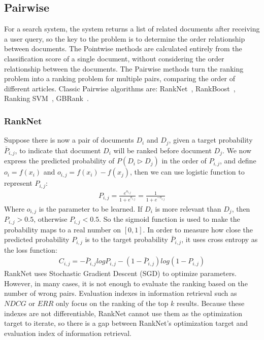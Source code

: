 \subsection{Pairwise}
For a search system, the system returns a list of related documents after receiving a user query, so the key to the problem is to determine the order relationship between documents. The Pointwise methods are calculated entirely from the classification score of a single document, without considering the order relationship between the documents. The Pairwise methods turn the ranking problem into a ranking problem for multiple pairs, comparing the order of different articles.
Classic Pairwise algorithms are: RankNet~\cite{Burges:2005:LRU:1102351.1102363}, RankBoost~\cite{freund2003efficient}, Ranking SVM~\cite{joachims2002optimizing}, GBRank~\cite{zheng2007regression}.
 \subsubsection{RankNet}
Suppose there is now a pair of documents $ D_i $ and $ D_j $, given a target probability $\bar{P}_{i,j}$, to indicate that document $ D_i $ will be ranked before document $ D_j $. We now express the predicted probability of $P(D_i \triangleright D_j)$ in the order of $P_{i,j}$, and define $o_i = f(x_i)$ and $o_{i,j}=f(x_i)-f(x_j)$, then we can use logistic function to represent $ P_ {i, j} $:
\begin{equation}
\begin{aligned}
P_{i,j} = \frac{e^{o_{i,j}}}{1+e^{o_{i,j}}} = \frac{1}{1+e^{-o_{i,j}}}
\end{aligned}
\label{eqn:eq6}
\end{equation}
Where $ o_{i,j} $ is the parameter to be learned. If $ D_i $  is more relevant than $ D_j $, then $P_{i,j}>0.5$, otherwise $P_{i,j}<0.5$. So the sigmoid function is used to make the probability maps to a real number on $[0, 1]$. In order to measure how close the predicted probability $P_{i,j}$ is to the target probability $\bar{P}_{i,j}$, it uses cross entropy as the loss function:
\begin{equation}
\begin{aligned}
C_{i,j} = -\bar{P}_{i,j} log P_{i,j} - (1-\bar{P}_{i,j}) log (1-P_{i,j})
\end{aligned}
\label{eqn:eq7}
\end{equation}
RankNet uses Stochastic Gradient Descent (SGD) to optimize parameters.
However, in many cases, it is not enough to evaluate the ranking based on the number of wrong pairs. Evaluation indexes in information retrieval such as $NDCG$ or $ERR$ only focus on the ranking of the top $k$ results. Because these indexes are not differentiable, RankNet cannot use them as the optimization target to iterate, so there is a gap between RankNet's optimization target and evaluation index of information retrieval.
